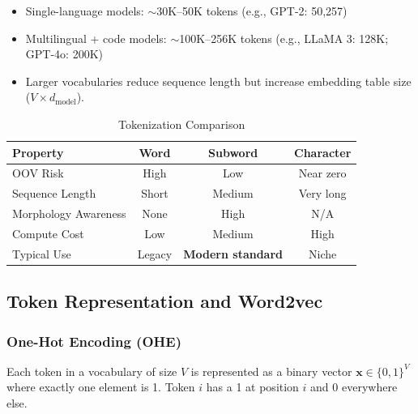 \documentclass[11pt, a4paper]{article}
\begin{document}
\begin{notebox}
\begin{itemize}[leftmargin=1.5em]
  \item Single-language models: $\sim$30K--50K tokens (e.g., GPT-2: 50,257)
  \item Multilingual + code models: $\sim$100K--256K tokens (e.g., LLaMA 3: 128K; GPT-4o: 200K)
  \item Larger vocabularies reduce sequence length but increase embedding table size ($V \times d_{\text{model}}$).
\end{itemize}
\end{notebox}

\begin{table}[h]
\centering
\caption{Tokenization Comparison}
\begin{tabular}{@{}lccc@{}}
\toprule
\textbf{Property} & \textbf{Word} & \textbf{Subword} & \textbf{Character} \\
\midrule
OOV Risk & High & Low & Near zero \\
Sequence Length & Short & Medium & Very long \\
Morphology Awareness & None & High & N/A \\
Compute Cost & Low & Medium & High \\
Typical Use & Legacy & \textbf{Modern standard} & Niche \\
\bottomrule
\end{tabular}
\end{table}

\subsection{Token Representation and Word2vec}

\subsubsection{One-Hot Encoding (OHE)}

\begin{defbox}
Each token in a vocabulary of size $V$ is represented as a binary vector $\mathbf{x} \in \{0,1\}^V$ where exactly one element is 1. Token $i$ has a 1 at position $i$ and 0 everywhere else.
\end{defbox}
\end{document}
